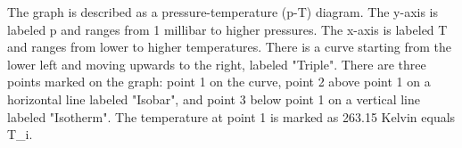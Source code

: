 The graph is described as a pressure-temperature (p-T) diagram. The y-axis is labeled p and ranges from 1 millibar to higher pressures. The x-axis is labeled T and ranges from lower to higher temperatures. There is a curve starting from the lower left and moving upwards to the right, labeled "Triple". There are three points marked on the graph: point 1 on the curve, point 2 above point 1 on a horizontal line labeled "Isobar", and point 3 below point 1 on a vertical line labeled "Isotherm". The temperature at point 1 is marked as 263.15 Kelvin equals T_i.
